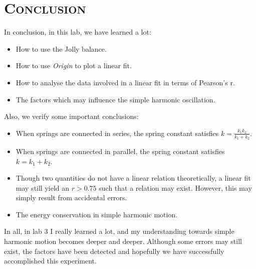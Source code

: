 \documentclass[a4paper,12pt]{article}
\begin{document}
\section{\textsc{Conclusion}}
In conclusion, in this lab, we have learned a lot:
\begin{itemize}
\item How to use the Jolly balance.
\item How to use \textit{Origin} to plot a linear fit.
\item How to analyse the data involved in a linear fit in terms of Pearson's r. 
\item The factors which may influence the simple harmonic oscillation. 
\end{itemize}
\par Also, we verify some important conclusions:
\begin{itemize}
\item When springs are connected in series, the spring constant satisfies $\displaystyle k = \frac{k_1k_2}{k_1+k_2} $.
\item When springs are connected in parallel, the spring constant satisfies $\displaystyle k = k_1 + k_2 $.
\item Though two quantities do not have a linear relation theoretically, a linear fit may still yield an $r > 0.75$ such that a relation may exist. However, this may simply result from accidental errors.
\item The energy conservation in simple harmonic motion.
\end{itemize}
\par In all, in lab 3 I really learned a lot, and my understanding towards simple harmonic motion becomes deeper and deeper. Although some errors may still exist, the factors have been detected and hopefully we have successfully accomplished this experiment.
\newpage
\end{document}
